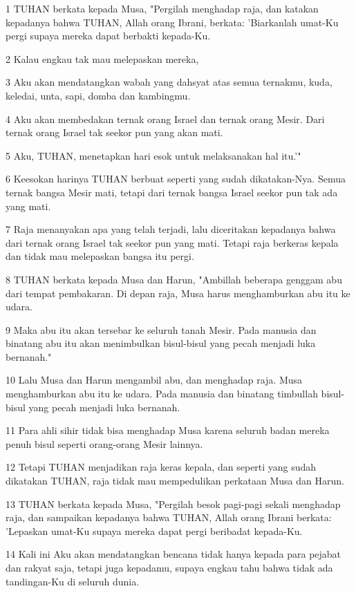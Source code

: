 \par 1 TUHAN berkata kepada Musa, "Pergilah menghadap raja, dan katakan kepadanya bahwa TUHAN, Allah orang Ibrani, berkata: 'Biarkanlah umat-Ku pergi supaya mereka dapat berbakti kepada-Ku.
\par 2 Kalau engkau tak mau melepaskan mereka,
\par 3 Aku akan mendatangkan wabah yang dahsyat atas semua ternakmu, kuda, keledai, unta, sapi, domba dan kambingmu.
\par 4 Aku akan membedakan ternak orang Israel dan ternak orang Mesir. Dari ternak orang Israel tak seekor pun yang akan mati.
\par 5 Aku, TUHAN, menetapkan hari esok untuk melaksanakan hal itu.'"
\par 6 Keesokan harinya TUHAN berbuat seperti yang sudah dikatakan-Nya. Semua ternak bangsa Mesir mati, tetapi dari ternak bangsa Israel seekor pun tak ada yang mati.
\par 7 Raja menanyakan apa yang telah terjadi, lalu diceritakan kepadanya bahwa dari ternak orang Israel tak seekor pun yang mati. Tetapi raja berkeras kepala dan tidak mau melepaskan bangsa itu pergi.
\par 8 TUHAN berkata kepada Musa dan Harun, "Ambillah beberapa genggam abu dari tempat pembakaran. Di depan raja, Musa harus menghamburkan abu itu ke udara.
\par 9 Maka abu itu akan tersebar ke seluruh tanah Mesir. Pada manusia dan binatang abu itu akan menimbulkan bisul-bisul yang pecah menjadi luka bernanah."
\par 10 Lalu Musa dan Harun mengambil abu, dan menghadap raja. Musa menghamburkan abu itu ke udara. Pada manusia dan binatang timbullah bisul-bisul yang pecah menjadi luka bernanah.
\par 11 Para ahli sihir tidak bisa menghadap Musa karena seluruh badan mereka penuh bisul seperti orang-orang Mesir lainnya.
\par 12 Tetapi TUHAN menjadikan raja keras kepala, dan seperti yang sudah dikatakan TUHAN, raja tidak mau mempedulikan perkataan Musa dan Harun.
\par 13 TUHAN berkata kepada Musa, "Pergilah besok pagi-pagi sekali menghadap raja, dan sampaikan kepadanya bahwa TUHAN, Allah orang Ibrani berkata: 'Lepaskan umat-Ku supaya mereka dapat pergi beribadat kepada-Ku.
\par 14 Kali ini Aku akan mendatangkan bencana tidak hanya kepada para pejabat dan rakyat saja, tetapi juga kepadamu, supaya engkau tahu bahwa tidak ada tandingan-Ku di seluruh dunia.
